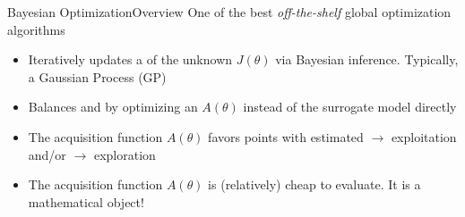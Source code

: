 \documentclass{beamer}
\begin{document}
\begin{frame}{Bayesian Optimization}{Overview}
One of the best \emph{off-the-shelf} global optimization algorithms%
\begin{itemize}
 \item Iteratively updates a  of the unknown $J(\theta)$ via Bayesian inference. Typically, a Gaussian Process (GP)
 \item Balances  and  by optimizing an 
  $A(\theta)$ instead of the surrogate model directly
 \item The acquisition function $A(\theta)$ favors points with estimated  
 $\rightarrow$ exploitation and/or  $\rightarrow$ exploration
 \item The acquisition function $A(\theta)$ is (relatively) cheap to evaluate. It is a mathematical object!
\end{itemize}
\pause
\end{frame}
\end{document}
